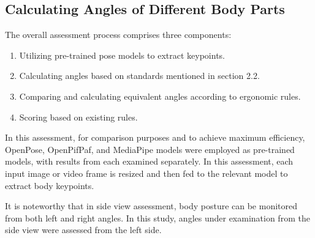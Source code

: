 \documentclass[lettersize,journal]{IEEEtran}
\begin{document}
\subsection{Calculating Angles of Different Body Parts}

The overall assessment process comprises three components:
\begin{enumerate}
    \item Utilizing pre-trained pose models to extract keypoints.
    \item Calculating angles based on standards mentioned in section 2.2.
    \item Comparing and calculating equivalent angles according to ergonomic rules.
    \item Scoring based on existing rules.
\end{enumerate}

In this assessment, for comparison purposes and to achieve maximum efficiency, OpenPose, OpenPifPaf, and MediaPipe models were employed as pre-trained models, with results from each examined separately.
In this assessment, each input image or video frame is resized and then fed to the relevant model to extract body keypoints.

It is noteworthy that in side view assessment, body posture can be monitored from both left and right angles. In this study, angles under examination from the side view were assessed from the left side.
\end{document}
